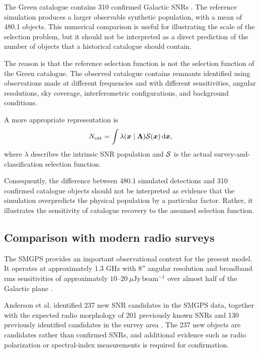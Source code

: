 \documentclass[
aps,
prd,
reprint,
superscriptaddress,
nofootinbib
]{revtex4-2}
\newcommand{\dd}{\mathrm{d}}
\begin{document}
	The Green catalogue contains 310 confirmed Galactic SNRs
	\cite{Green2025}.  The reference simulation produces a larger observable
	synthetic population, with a mean of 480.1 objects.  This numerical comparison
	is useful for illustrating the scale of the selection problem, but it should
	not be interpreted as a direct prediction of the number of objects that a
	historical catalogue should contain.
	
	The reason is that the reference selection function is not the selection
	function of the Green catalogue.  The observed catalogue contains remnants
	identified using observations made at different frequencies and with different
	sensitivities, angular resolutions, sky coverage, interferometric
	configurations, and background conditions.
	
	A more appropriate representation is
	\begin{equation}
		N_{\rm cat}
		=
		\int
		\lambda(\bm{x}\mid\bm{\Lambda})
		{\cal S}(\bm{x})
		\,\dd\bm{x},
		\label{eq:catalogue}
	\end{equation}
	where $\lambda$ describes the intrinsic SNR population and ${\cal S}$ is the
	actual survey-and-classification selection function.
	
	Consequently, the difference between 480.1 simulated detections and 310
	confirmed catalogue objects should not be interpreted as evidence that the
	simulation overpredicts the physical population by a particular factor.
	Rather, it illustrates the sensitivity of catalogue recovery to the assumed
	selection function.
	
	\subsection{Comparison with modern radio surveys}
	
	The SMGPS provides an important observational context for the present model.
	It operates at approximately 1.3 GHz with $8''$ angular resolution and
	broadband rms sensitivities of approximately
	$10$--$20~\mu\mathrm{Jy\,beam^{-1}}$ over almost half of the Galactic plane
	\cite{Goedhart2024}.
	
	Anderson et al. identified 237 new SNR candidates in the SMGPS data, together
	with the expected radio morphology of 201 previously known SNRs and 130
	previously identified candidates in the survey area
	\cite{Anderson2025}.  The 237 new objects are candidates rather than confirmed
	SNRs, and additional evidence such as radio polarization or spectral-index
	measurements is required for confirmation.
	
\end{document}
